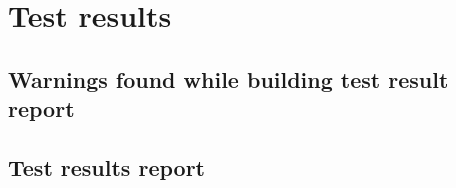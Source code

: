 \section{Test results}
\label{sec:testresults}

\subsection{Warnings found while building test result report}
\label{subsec:testresults-warning}



\subsection{Test results report}
\label{subsec:testresults-report}

